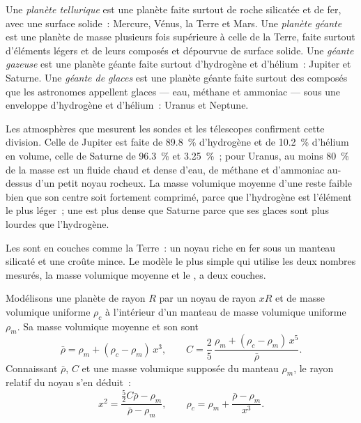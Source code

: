 \begin{definition}\label{def:b1:comparative-planetology:planet-types}
Une \emph{planète tellurique} est une planète faite surtout de roche
silicatée et de fer, avec une surface solide~: Mercure, Vénus, la Terre et
Mars. Une \emph{planète géante} est une planète de masse plusieurs fois
supérieure à celle de la Terre, faite surtout d'éléments légers et de leurs
composés et dépourvue de surface solide. Une \emph{géante gazeuse}
est une planète géante faite surtout d'hydrogène et d'hélium~: Jupiter et
Saturne. Une \emph{géante de glaces} est une planète géante faite surtout
des composés que les astronomes appellent glaces --- eau, méthane et ammoniac
--- sous une enveloppe d'hydrogène et d'hélium~: Uranus et Neptune.
\end{definition}

Les atmosphères que mesurent les sondes et les télescopes confirment cette
division. Celle de Jupiter est faite de \qty{89.8}{\percent} d'hydrogène et de
\qty{10.2}{\percent} d'hélium en volume, celle de Saturne de
\qty{96.3}{\percent} et \qty{3.25}{\percent}~; pour Uranus, au moins
\qty{80}{\percent} de la masse est un fluide chaud et dense d'eau, de méthane
et d'ammoniac au-dessus d'un petit noyau rocheux. La masse volumique moyenne
d'une  reste faible bien que son centre soit fortement comprimé,
parce que l'hydrogène est l'élément le plus léger~; une  est
plus dense que Saturne parce que ses glaces sont plus lourdes que l'hydrogène.

Les  sont en couches comme la Terre~: un noyau riche en fer
sous un manteau silicaté et une croûte mince. Le modèle le plus simple qui
utilise les deux nombres mesurés, la masse volumique moyenne et le , a deux couches.

\begin{proposition}\label{prop:b1:comparative-planetology:two-layer}
Modélisons une planète de rayon $R$ par un noyau de rayon $xR$ et de masse
volumique uniforme $\rho_c$ à l'intérieur d'un manteau de masse volumique
uniforme $\rho_m$. Sa masse volumique moyenne et son  sont
\[
  \bar\rho = \rho_m + (\rho_c - \rho_m)\,x^3 , \qquad
  C = \frac25\,\frac{\rho_m + (\rho_c - \rho_m)\,x^5}{\bar\rho} .
\]
Connaissant $\bar\rho$, $C$ et une masse volumique supposée du manteau $\rho_m$,
le rayon relatif du noyau s'en déduit~:
\[
  x^2 = \frac{\tfrac52C\bar\rho - \rho_m}{\bar\rho - \rho_m} ,
  \qquad \rho_c = \rho_m + \frac{\bar\rho - \rho_m}{x^3} .
\]
\end{proposition}

